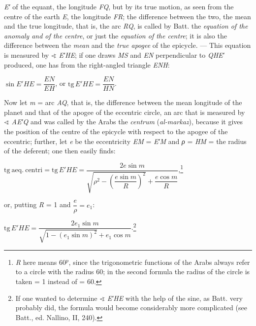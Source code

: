 \documentclass[11pt]{article}
\begin{document}
\emph{E′} of the equant, the longitude \emph{FQ}, but by its true motion, as seen from the centre of the earth \emph{E}, the longitude \emph{FR}; the difference between the two, the mean and the true longitude, that is, the arc \emph{RQ}, is called by Batt. the \emph{equation of the anomaly and of the centre}, or just the \emph{equation of the centre}; it is also the difference between the \emph{mean} and the \emph{true apogee} of the epicycle. — This equation is measured by {\SignFont\upshape ∢} \emph{E′HE}; if one draws \emph{MS} and \emph{EN} perpendicular to \emph{QHE′} produced, one has from the right-angled triangle \emph{ENH}:\par
\par\begin{center}$\sin E'HE = \dfrac{EN}{EH}$, or $\mathrm{tg}\,E'HE = \dfrac{EN}{HN}$.\end{center}
\par Now let \emph{m} = arc \emph{AQ}, that is, the difference between the mean longitude of the planet and that of the apogee of the eccentric circle, an arc that is measured by {\SignFont\upshape ∢} \emph{AE′Q} and was called by the Arabs the \emph{centrum} (\emph{al-markaz}), because it gives the position of the centre of the epicycle with respect to the apogee of the eccentric; further, let \emph{e} be the eccentricity \emph{EM} = \emph{E′M} and \emph{{\greekfont ρ}} = \emph{HM} = the radius of the deferent; one then easily finds:\par
\par\begin{center}$\mathrm{tg\ aeq.\ centri} = \mathrm{tg}\,E'HE = \dfrac{2e\sin m}{\sqrt{\rho^{2}-\left(\dfrac{e\sin m}{R}\right)^{2}}+\dfrac{e\cos m}{R}}$,\footnote{\emph{R} here means 60$^{p}$, since the trigonometric functions of the Arabs always refer to a circle with the radius 60; in the second formula the radius of the circle is taken = 1 instead of = 60.}\end{center}
\par or, putting \emph{R} = 1 and $\dfrac{e}{\rho} = e_{1}$:\par
\par\begin{center}$\mathrm{tg}\,E'HE = \dfrac{2e_{1}\sin m}{\sqrt{1-(e_{1}\sin m)^{2}}+e_{1}\cos m}$.\footnote{If one wanted to determine {\SignFont\upshape ∢} \emph{E′HE} with the help of the sine, as Batt. very probably did, the formula would become considerably more complicated (see Batt., ed. Nallino, II, 240).}\end{center}
\end{document}
